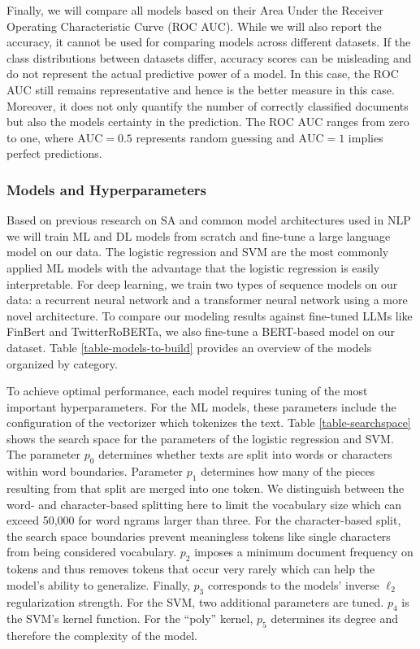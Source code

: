 

Finally, we will compare all models based on their Area Under the Receiver Operating Characteristic Curve (ROC AUC). While we will also report the accuracy, it cannot be used for comparing models across different datasets. If the class distributions between datasets differ, accuracy scores can be misleading and do not represent the actual predictive power of a model. In this case, the ROC AUC still remains representative and hence is the better measure in this case. Moreover, it does not only quantify the number of correctly classified documents but also the models certainty in the prediction. The ROC AUC ranges from zero to one, where $\textrm{AUC}=0.5$ represents random guessing and $\textrm{AUC}=1$ implies perfect predictions.

\subsubsection{Models and Hyperparameters}
Based on previous research on SA and common model architectures used in NLP we will train ML and DL models from scratch and fine-tune a large language model on our data. The logistic regression and SVM are the most commonly applied ML models with the advantage that the logistic regression is easily interpretable. For deep learning, we train two types of sequence models on our data: a recurrent neural network and a transformer neural network using a more novel architecture. To compare our modeling results against fine-tuned LLMs like FinBert and TwitterRoBERTa, we also fine-tune a BERT-based model on our dataset. Table \ref{table-models-to-build} provides an overview of the models organized by category.



To achieve optimal performance, each model requires tuning of the most important hyperparameters. For the ML models, these parameters include the configuration of the vectorizer which tokenizes the text. Table \ref{table-searchspace} shows the search space for the parameters of the logistic regression and SVM. The parameter $p_0$ determines whether texts are split into words or characters within word boundaries. Parameter $p_1$ determines how many of the pieces resulting from that split are merged into one token. We distinguish between the word- and character-based splitting here to limit the vocabulary size which can exceed 50,000 for word ngrams larger than three. For the character-based split, the search space boundaries prevent meaningless tokens like single characters from being considered vocabulary. $p_2$ imposes a minimum document frequency on tokens and thus removes tokens that occur very rarely which can help the model's ability to generalize. Finally, $p_3$ corresponds to the models' inverse $\ell_2$ regularization strength. For the SVM, two additional parameters are tuned. $p_4$ is the SVM's kernel function. For the ``poly'' kernel, $p_5$ determines its degree and therefore the complexity of the model.

